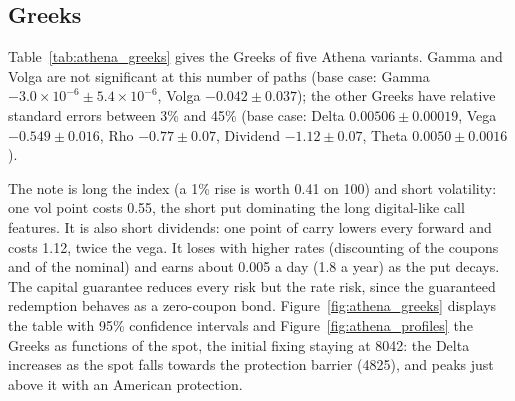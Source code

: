 \documentclass[11pt,a4paper]{article}
\begin{document}
\subsection{Greeks}
Table~\ref{tab:athena_greeks} gives the Greeks of five Athena variants. Gamma and Volga are not significant at
this number of paths (base case: Gamma $-3.0 \times 10^{-6} \pm 5.4 \times 10^{-6}$, Volga $-0.042 \pm 0.037$);
the other Greeks have relative standard errors between 3\% and 45\% (base case: Delta $0.00506 \pm 0.00019$, Vega
$-0.549 \pm 0.016$, Rho $-0.77 \pm 0.07$, Dividend $-1.12 \pm 0.07$, Theta $0.0050 \pm 0.0016$).

\begin{table}[h]
\centering
{}
\caption{Greeks of Athena variants (nominal 100, coupon 8\%).}
\label{tab:athena_greeks}
\end{table}

The note is long the index (a 1\% rise is worth 0.41 on 100) and short volatility: one vol point costs 0.55, the
short put dominating the long digital-like call features. It is also short dividends: one point of carry lowers
every forward and costs 1.12, twice the vega. It loses with higher rates (discounting of the coupons and of the
nominal) and earns about 0.005 a day (1.8 a year) as the put decays. The capital guarantee reduces every risk but
the rate risk, since the guaranteed redemption behaves as a zero-coupon bond. Figure~\ref{fig:athena_greeks}
displays the table with 95\% confidence intervals and Figure~\ref{fig:athena_profiles} the Greeks as functions of
the spot, the initial fixing staying at 8042: the Delta increases as the spot falls towards the protection barrier
(4825), and peaks just above it with an American protection.
\end{document}
